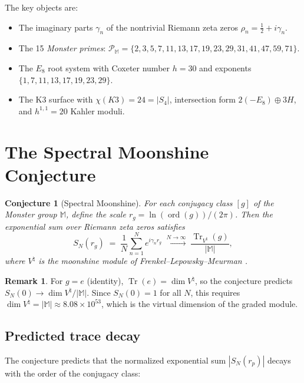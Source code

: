 \documentclass[11pt]{amsart}
\newtheorem{conjecture}[theorem]{Conjecture}
\theoremstyle{definition}
\newtheorem{remark}[theorem]{Remark}
\begin{document}
The key objects are:
\begin{itemize}
\item The imaginary parts $\gamma_n$ of the nontrivial Riemann zeta zeros $\rho_n = \tfrac{1}{2} + i\gamma_n$.
\item The 15 \emph{Monster primes}: $\mathcal{P}_{\mathbb{M}} = \{2, 3, 5, 7, 11, 13, 17, 19, 23, 29, 31, 41, 47, 59, 71\}$.
\item The $E_8$ root system with Coxeter number $h = 30$ and exponents $\{1, 7, 11, 13, 17, 19, 23, 29\}$.
\item The K3 surface with $\chi(K3) = 24 = |S_4|$, intersection form $2(-E_8) \oplus 3H$, and $h^{1,1} = 20$ Kahler moduli.
\end{itemize}


\section{The Spectral Moonshine Conjecture}
\label{sec:conjecture}

\begin{conjecture}[Spectral Moonshine]\label{conj:main}
For each conjugacy class $[g]$ of the Monster group $\mathbb{M}$, define the scale $r_g = \ln(\operatorname{ord}(g))/(2\pi)$. Then the exponential sum over Riemann zeta zeros satisfies
\[
S_N(r_g) \;=\; \frac{1}{N}\sum_{n=1}^{N} e^{i\gamma_n r_g} \;\xrightarrow{N \to \infty}\; \frac{\operatorname{Tr}_{V^\natural}(g)}{|\mathbb{M}|},
\]
where $V^\natural$ is the moonshine module of Frenkel--Lepowsky--Meurman \cite{flm1988}.
\end{conjecture}

\begin{remark}
For $g = e$ (identity), $\operatorname{Tr}(e) = \dim V^\natural$, so the conjecture predicts $S_N(0) \to \dim V^\natural / |\mathbb{M}|$. Since $S_N(0) = 1$ for all $N$, this requires $\dim V^\natural = |\mathbb{M}| \approx 8.08 \times 10^{53}$, which is the virtual dimension of the graded module.
\end{remark}

\subsection{Predicted trace decay}

The conjecture predicts that the normalized exponential sum $|S_N(r_p)|$ decays with the order of the conjugacy class:
\end{document}

